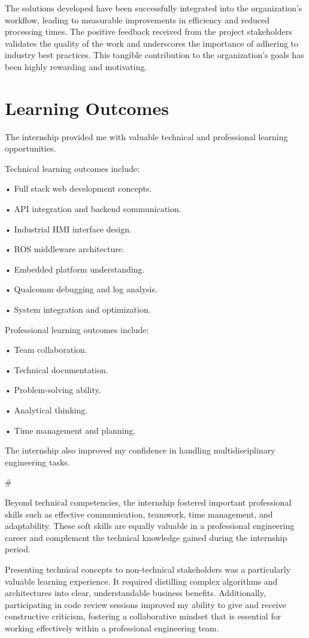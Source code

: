 \documentclass[12pt,a4paper]{report}
\begin{document}
The solutions developed have been successfully integrated into the organization's workflow, leading to measurable improvements in efficiency and reduced processing times. The positive feedback received from the project stakeholders validates the quality of the work and underscores the importance of adhering to industry best practices. This tangible contribution to the organization's goals has been highly rewarding and motivating.


\section{Learning Outcomes}

The internship provided me with valuable technical and professional learning opportunities.


Technical learning outcomes include:


• Full stack web development concepts.


• API integration and backend communication.


• Industrial HMI interface design.


• ROS middleware architecture.


• Embedded platform understanding.


• Qualcomm debugging and log analysis.


• System integration and optimization.


Professional learning outcomes include:


• Team collaboration.


• Technical documentation.


• Problem-solving ability.


• Analytical thinking.


• Time management and planning.


The internship also improved my confidence in handling multidisciplinary engineering tasks.


\#


Beyond technical competencies, the internship fostered important professional skills such as effective communication, teamwork, time management, and adaptability. These soft skills are equally valuable in a professional engineering career and complement the technical knowledge gained during the internship period.


Presenting technical concepts to non-technical stakeholders was a particularly valuable learning experience. It required distilling complex algorithms and architectures into clear, understandable business benefits. Additionally, participating in code review sessions improved my ability to give and receive constructive criticism, fostering a collaborative mindset that is essential for working effectively within a professional engineering team.
\end{document}
